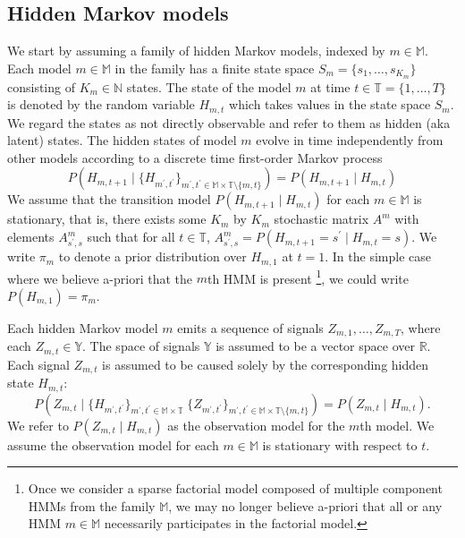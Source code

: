 \documentclass[twoside, 11pt]{article}
\newcommand{\mm}[0] {\mathbb{M}} %
\newcommand{\TT}[0] {\mathbb{T}} %
\newcommand{\reals}[0] {\mathbb{R}}
\newcommand{\naturals}[0] {\mathbb{N}}
\newcommand{\events}[0] {\mathbb{Y}}
\begin{document}
\subsection{Hidden Markov models}
We start by assuming a family of hidden Markov models, indexed by $m \in \mm$. Each model $m \in \mm$ in the family has a finite state space $S_m = \{s_1, \ldots, s_{K_m}\}$ consisting of $K_m \in \naturals$ states. The state of the model $m$ at time $t \in \TT = \{ 1, \ldots, T \}$ is denoted by the random variable $H_{m, t}$ which takes values in the state space $S_m$. We regard the states as not directly observable and refer to them as hidden (aka latent) states. The hidden states of model $m$ evolve in time independently from other models according to a discrete time first-order Markov process
\begin{equation}
P(H_{m,t+1} \mid \{ H_{m^{\prime},t^{\prime}} \}_{m^{\prime}, t^{\prime} \in \mm \times \TT \setminus \{m, t\}} )
=
P(H_{m,t+1} \mid H_{m,t} )
\end{equation}
We assume that the transition model $P(H_{m,t+1} \mid H_{m,t} )$ for each $m \in \mm$ is stationary, that is, there exists some $K_m$ by $K_m$ stochastic matrix $A^{m}$ with elements $A^{m}_{s^{\prime}, s}$ such that for all $t \in \TT$, $A^{m}_{s^{\prime}, s} = P(H_{m, t+1}=s^{\prime} \mid H_{m,t}=s)$. We write $\pi_m$ to denote a prior distribution over $H_{m,1}$ at $t=1$. In the simple case where we believe a-priori that the $m$th HMM is present \footnote{Once we consider a sparse factorial model composed of multiple component HMMs from the family $\mm$, we may no longer believe a-priori that all or any HMM $m \in \mm$ necessarily participates in the factorial model.}, we could write $P(H_{m,1}) = \pi_m$.

Each hidden Markov model $m$ emits a sequence of signals $Z_{m,1}, \ldots, Z_{m,T}$, where each $Z_{m,t} \in \events$. The space of signals $\events$ is assumed to be a vector space over $\reals$. Each signal $Z_{m,t}$ is assumed to be caused solely by the corresponding hidden state $H_{m,t}$:
\begin{equation}
P\left(Z_{m,t}
\mid
\{ H_{m^{\prime},t^{\prime}} \}_{m^{\prime}, t^{\prime} \in \mm \times \TT} \;
\{ Z_{m^{\prime},t^{\prime}} \}_{m^{\prime}, t^{\prime} \in \mm \times \TT \setminus \{m, t\}}
\right)
=
P(Z_{m,t} \mid H_{m,t} ) .
\end{equation}
We refer to $P(Z_{m, t} \mid H_{m,t} )$ as the observation model for the $m$th model. We assume the observation model for each $m \in \mm$ is stationary with respect to $t$.
\end{document}
